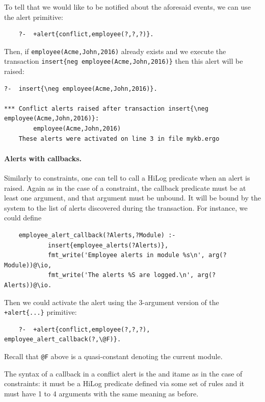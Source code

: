 To tell \ERGO that we would like to be notified about the aforesaid events,
we can use the alert primitive:
\begin{verbatim}
    ?-  +alert{conflict,employee(?,?,?)}.
\end{verbatim}
Then, if \texttt{employee(Acme,John,2016)} already exists and we execute
the transaction \texttt{insert\{\bs{}neg employee(Acme,John,2016)\}} then
this alert will be raised:
\begin{verbatim}
?-  insert{\neg employee(Acme,John,2016)}.

*** Conflict alerts raised after transaction insert{\neg employee(Acme,John,2016)}:
        employee(Acme,John,2016)
    These alerts were activated on line 3 in file mykb.ergo
\end{verbatim}

\paragraph{Alerts with callbacks.}
Similarly to constraints, one can tell \ERGO to call a HiLog predicate when
an alert is raised. Again as in the case of a constraint, the callback
predicate must be at least one argument, and that argument must be unbound.
It will be bound by the system to the list of alerts discovered during the
transaction. 
For instance, we could define
\begin{verbatim}
    employee_alert_callback(?Alerts,?Module) :-
            insert{employee_alerts(?Alerts)},
            fmt_write('Employee alerts in module %s\n', arg(?Module))@\io,
            fmt_write('The alerts %S are logged.\n', arg(?Alerts))@\io.
\end{verbatim}
Then we could activate the alert using the 3-argument version of the
\texttt{+alert\{...\}} primitive:
\begin{verbatim}
    ?-  +alert{conflict,employee(?,?,?), employee_alert_callback(?,\@F)}.
\end{verbatim}
Recall that \texttt{\bs{}@F} above is a quasi-constant denoting the current
module. 

The syntax of a callback in a conflict alert
is the  and itame as in the case of constraints: it must be a HiLog predicate defined
via some set of rules and it must have 1 to 4 arguments with the 
same meaning as before.

